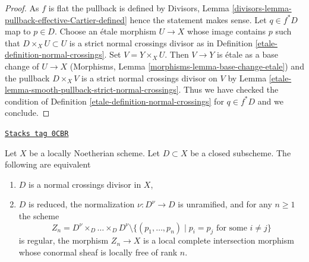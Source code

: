\begin{proof}

As $f$ is flat the pullback is defined by
Divisors, Lemma \ref{divisors-lemma-pullback-effective-Cartier-defined}
hence the statement makes sense.
Let $q \in f^*D$ map to $p \in D$.
Choose an \'etale morphism $U \to X$ whose image contains $p$
such that $D \times_X U \subset U$ is a strict normal crossings
divisor as in Definition \ref{etale-definition-normal-crossings}.
Set $V = Y \times_X U$. Then $V \to Y$ is \'etale as a base
change of $U \to X$
(Morphisms, Lemma \ref{morphisms-lemma-base-change-etale})
and the pullback $D \times_X V$ is a strict normal crossings
divisor on $V$ by Lemma \ref{etale-lemma-smooth-pullback-strict-normal-crossings}.
Thus we have checked the condition of
Definition \ref{etale-definition-normal-crossings}
for $q \in f^*D$ and we conclude.
\end{proof}

\begin{lemma}
\label{etale-lemma-characterize-normal-crossings-normalization}
\href{https://stacks.math.columbia.edu/tag/0CBR}{\texttt{Stacks tag 0CBR}}

Let $X$ be a locally Noetherian scheme. Let $D \subset X$ be a closed
subscheme. The following are equivalent
\begin{enumerate}
\item $D$ is a normal crossings divisor in $X$,
\item $D$ is reduced, the normalization $\nu : D^\nu \to D$ is unramified,
and for any $n \geq 1$ the scheme
$$
Z_n = D^\nu \times_D \ldots \times_D D^\nu
\setminus \{(p_1, \ldots, p_n) \mid p_i = p_j\text{ for some }i\not = j\}
$$
is regular, the morphism $Z_n \to X$ is a local complete intersection
morphism whose conormal sheaf is locally free of rank $n$.
\end{enumerate}
\end{lemma}

